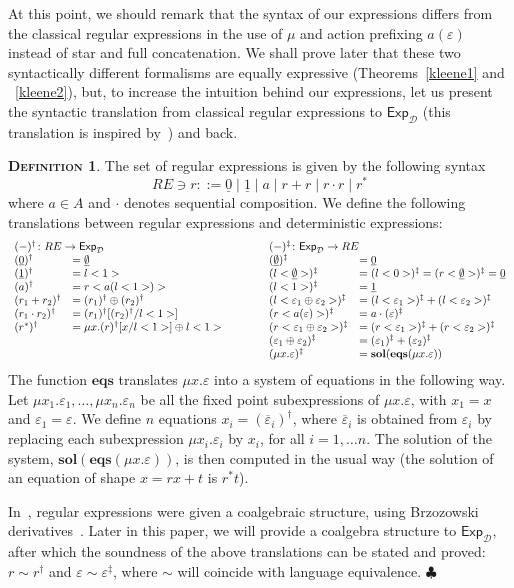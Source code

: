 \documentclass{LMCS}
\newcommand\D{\mathcal{D}}
\newcommand\E\varepsilon
\newcommand\Exp{\mathsf{Exp}}
\newcommand\emp{\underline\emptyset}
\theoremstyle{definition}
\newtheorem{mydefinition}{\textsc{Definition}}[section]
\theoremstyle{plain}
\theoremstyle{plain}
\theoremstyle{plain}
\theoremstyle{plain}
\theoremstyle{definition}
\theoremstyle{definition}
\newenvironment{definition}{
\begin{mydefinition}}
    {\hfill$\clubsuit$\end{mydefinition}}
\begin{document}
At this point, we should remark that the syntax of our expressions
differs from the classical regular expressions in the use of $\mu$
and action prefixing $a(\E)$ instead of star and full concatenation.
We shall prove later that these two syntactically different
formalisms are equally expressive (Theorems~\ref{kleene1} and
~\ref{kleene2}), but, to increase the intuition behind our expressions,
 let us present the syntactic translation from classical
regular expressions to $\Exp_\D$ (this translation is inspired
by~\cite{milner}) and back. 

\begin{definition}\label{def:regexp_to_exp} The set of regular expressions is given by the following syntax
\[
RE \ni r ::= \underline 0 \mid \underline 1 \mid a \mid r+r \mid r\cdot r \mid r^*
\]
where $a\in A$ and $\cdot$ denotes sequential composition. We define the following translations between regular expressions and deterministic expressions:
$$
\begin{array}{llp{.8cm}ll}
\multicolumn{2}{l}{(-)^\dagger\colon RE \to
\Exp_\D}&&\multicolumn{2}{l}{(-)^\ddagger\colon \Exp_\D \to RE}\\
 (\underline 0)^\dagger &= \emp &&  (\emp)^\ddagger
&= \underline 0\\
 (\underline 1)^\dagger &= l<1> && (l<\emp>)^\ddagger &=
(l<0>)^\ddagger = (r<\emp>)^\ddagger = \underline 0 \\
  (a)^\dagger &= r<a(l<1>)> && (l<1>)^\ddagger &=\underline 1 \\
 (r_1+r_2)^\dagger &= (r_1)^\dagger\oplus (r_2)^\dagger &&
(l<\E_1\oplus \E_2>)^\ddagger &=(l<\E_1>)^\ddagger+ (l<\E_2>)^\ddagger\\
 (r_1\cdot r_2)^\dagger &= (r_1)^\dagger [(r_2)^\dagger/l<1>] &&
(r<a(\E)>)^\ddagger &=a \cdot (\E)^\ddagger\\
  (r^*)^\dagger &= \mu x. (r)^\dagger[x/l<1>]\oplus l<1> &&
(r<\E_1\oplus \E_2>)^\ddagger &=(r<\E_1>)^\ddagger+
(r<\E_2>)^\ddagger\\
&&& (\E_1\oplus\E_2)^\ddagger &= (\E_1)^\ddagger+ (\E_2)^\ddagger\\
&&&  (\mu x. \E)^\ddagger &= \mathbf{sol}(\mathbf{eqs}(\mu x. \E)) 
\end{array}
$$
The function $\mathbf{eqs}$ translates $\mu x. \E$ into a system of
equations in the following way. Let $\mu x_1. \E_1, \ldots, \mu x_n.
\E_n$  be all the fixed point subexpressions of $\mu x. \E$, with
$x_1=x$ and $\E_1=\E$. We define $n$ equations $x_i =
(\overline\E_i)^\dagger$, where $\overline\E_i$ is obtained from
$\E_i$ by replacing each subexpression $\mu x_i. \E_i$ by $x_i$, for
all $i=1,\ldots n$. The solution of the system,
$\mathbf{sol}(\mathbf{eqs}(\mu x.\E))$, is then computed in the usual way (the solution of an equation of shape $x=rx+t$ is $r^*t$).

In~\cite{Rut98c}, regular expressions were given a coalgebraic
structure, using Brzozowski derivatives~\cite{Brz64}. Later in
this paper, we will provide a coalgebra structure to $\Exp_\D$, after
which the soundness of the above translations can be stated and proved: $r \sim
r^\dagger$ and $\E \sim \E^\ddagger$, where $\sim$ will coincide with language equivalence.
\end{definition}
\end{document}
